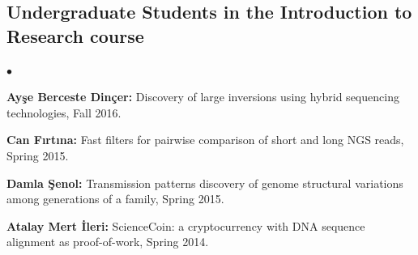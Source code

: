 \documentclass[margin,line]{res}
\newenvironment{list2}{
  \begin{list}{$\bullet$}{%
      \setlength{\itemsep}{0.1cm}
      \setlength{\parsep}{0in} \setlength{\parskip}{0in}
      \setlength{\topsep}{0in} \setlength{\partopsep}{0in} 
      \setlength{\leftmargin}{0.2in}}}{\end{list}}
\begin{document}
\begin{resume}
\vspace*{-.4cm}
  \subsection{\small \sc Undergraduate Students in the Introduction to Research course}
  \begin{list2}
  \item
    {\bf Ayşe Berceste Dinçer:} Discovery of large inversions using hybrid sequencing technologies, Fall 2016.
  \item
    {\bf Can Fırtına:} Fast filters for pairwise comparison of short and long NGS reads, Spring 2015.
  \item
    {\bf Damla Şenol:} Transmission patterns discovery of genome structural variations among generations of a family, Spring 2015.
  \item
    {\bf Atalay Mert İleri:} ScienceCoin: a cryptocurrency with DNA sequence alignment as proof-of-work, Spring 2014.
  \end{list2}
\vspace*{-.4cm}

\end{resume}
\end{document}
